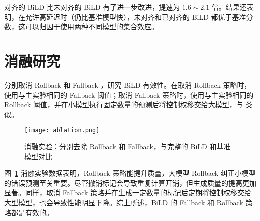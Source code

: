 对齐的 BiLD 比未对齐的 BiLD 有了进一步改进，提速为 $1.6\sim 2.1$ 倍。结果还表明，在允许高延迟时（仍比基准模型快），未对齐和已对齐的 BiLD 都优于基准分数，这可以归因于使用两种不同模型的集合效应。

\section{消融研究}

分别取消 Rollback 和 Fallback ，研究 BiLD 有效性。在取消 Rollback 策略时，使用与主实验相同的 Fallback 阈值；取消 Fallback 策略时，使用与主实验相同的 Rollback 阈值，并在小模型执行固定数量的预测后将控制权移交给大模型，与  类似。

\begin{figure}[htbp]
    \centering
    \texttt{[image: ablation.png]}
    \caption{
        消融实验：分别去除 Rollback 和 Fallback，与完整的 BiLD 和基准模型对比
    }
    \label{ablation}
\end{figure}

图~\ref{ablation} 消融实验数据表明，Rollback 策略能提升质量，大模型 Rollback 纠正小模型的错误预测至关重要。尽管撤销标记会导致重复计算开销，但生成质量的提高更加显著。同样，取消 Fallback 策略并在生成一定数量的标记后定期将控制权移交给大型模型，也会导致性能明显下降。综上所述，BiLD 的 Fallback 和 Rollback 策略都是有效的。
